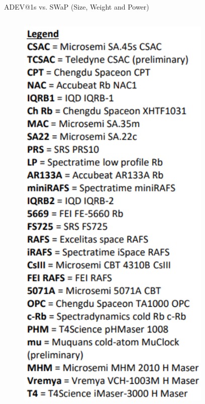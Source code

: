 \begin{frame}{ADEV@1s vs. SWaP (Size, Weight and Power)}
\begin{columns}[c, onlytextwidth]
\begin{column}{0.3\textwidth}
            \begin{figure}
                \centering
                \includegraphics[width=0.83\textwidth]{img/legend.png}
            \end{figure}

        \end{column}

    \end{columns}


\end{frame}



